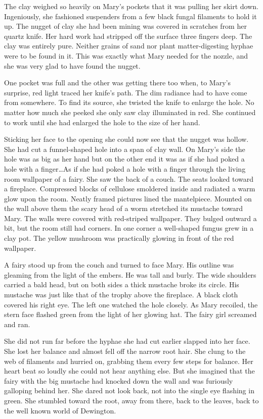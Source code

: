 \documentclass[10pt]{memoir}
\begin{document}
The clay weighed so heavily on Mary's pockets that it was pulling her skirt
down. Ingeniously, she fashioned suspenders from a few black fungal filaments
to hold it up. The nugget of clay she had been mining was covered in scratches
from her quartz knife. Her hard work had stripped off the surface three fingers
deep. The clay was entirely pure. Neither grains of sand nor plant
matter-digesting hyphae were to be found in it. This was exactly what Mary
needed for the nozzle, and she was very glad to have found the nugget.

One pocket was full and the other was getting there too when, to Mary's
surprise, red light traced her knife's path. The dim radiance had to have come
from somewhere. To find its source, she twisted the knife to enlarge the hole.
No matter how much she peeked she only saw clay illuminated in red. She
continued to work until she had enlarged the hole to the size of her hand.

Sticking her face to the opening she could now see that the nugget was hollow.
She had cut a funnel-shaped hole into a span of clay wall. On Mary's side the
hole was as big as her hand but on the other end it was as if she had poked a
hole with a finger\dots As if she had poked a hole with a finger through the living
room wallpaper of a fairy. She saw the back of a couch. The seats looked toward
a fireplace. Compressed blocks of cellulose smoldered inside and radiated a
warm glow upon the room. Neatly framed pictures lined the mantelpiece. Mounted
on the wall above them the scary head of a worm stretched its mustache toward
Mary. The walls were covered with red-striped wallpaper. They bulged outward a
bit, but the room still had corners. In one corner a well-shaped fungus grew in
a clay pot. The yellow mushroom was practically glowing in front of the red
wallpaper.

A fairy stood up from the couch and turned to face Mary. His outline was
gleaming from the light of the embers. He was tall and burly. The wide
shoulders carried a bald head, but on both sides a thick mustache broke its
circle. His mustache was just like that of the trophy above the fireplace. A
black cloth covered his right eye. The left one watched the hole closely. As
Mary recoiled, the stern face flashed green from the light of her glowing hat.
The fairy girl screamed and ran.

She did not run far before the hyphae she had cut earlier slapped into her
face. She lost her balance and almost fell off the narrow root hair. She clung
to the web of filaments and hurried on, grabbing them every few steps for
balance. Her heart beat so loudly she could not hear anything else. But she
imagined that the fairy with the big mustache had knocked down the wall and was
furiously galloping behind her. She dared not look back, not into the single
eye flashing in green. She stumbled toward the root, away from there, back to
the leaves, back to the well known world of Dewington.
\end{document}
